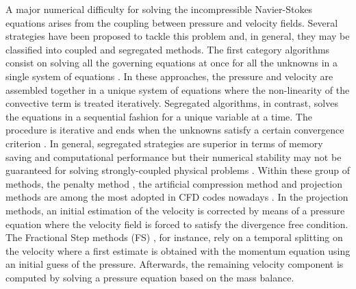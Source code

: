 \documentclass[final,3p,times,11pt,onecolumn]{myElsarticle}
\numberwithin{equation}{section}
\begin{document}
A major numerical difficulty for solving the incompressible Navier-Stokes equations arises from the coupling between
pressure and velocity fields. Several strategies have been proposed to tackle this problem and, in general, they may
be classified into coupled and segregated methods. The first category algorithms consist on solving all the governing
equations at once for all the unknowns in a single system of equations \cite{mazhar1, mazhar2, chen, darwish1, darwish2, uroic}. In these approaches, the pressure and velocity are assembled together in a unique system of equations where the non-linearity of the convective term is treated iteratively. Segregated algorithms, in contrast, solves the equations in a sequential fashion for a unique variable at a time. The procedure is iterative and ends when the unknowns satisfy a certain convergence criterion \cite{ferziger, versteeg, moukalled}. In general, segregated strategies are superior in terms of memory saving and computational performance but their numerical stability may not be guaranteed for solving strongly-coupled physical problems \cite{wang, uroic}. Within these group of methods, the penalty method \cite{temam1968methode}, the artificial compression method \cite{harten1977artificial} and projection methods \cite{chorin1, chorin2, temam1968methode} are among the most adopted in CFD codes nowadays \cite{wang2}. In the projection methods, an initial estimation of the velocity is corrected by means of a pressure equation where the velocity field is forced to satisfy the divergence free condition. The Fractional Step methods (FS) \cite{kim}, for instance, rely on a temporal splitting on the velocity where a first estimate is obtained with the momentum equation using an initial guess of the pressure. Afterwards, the remaining velocity component is computed by solving a pressure equation based on the mass balance.
\end{document}
